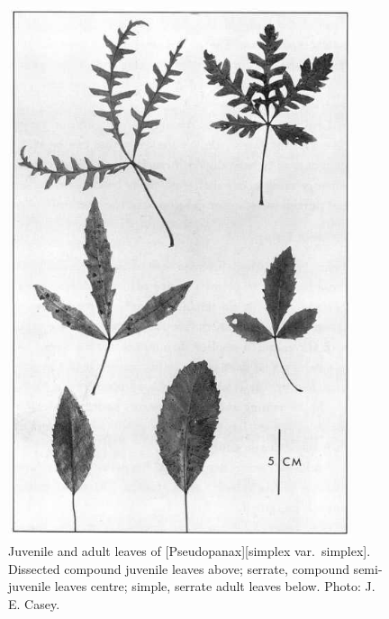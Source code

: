 \begin{figure}[!htb]
	\centering
	\begin{minipage}[t]{0.516\textwidth}
		\centering
		\includegraphics[width=0.9\textwidth]{graphics/figure18pseudopanax.jpg}
    	\caption[Juvenile and adult leaves of \emph{Pseudopanax simplex var.\ simplex}]{Juvenile and adult leaves of [Pseudopanax][simplex var.\ simplex].
        Dissected compound juvenile leaves above; serrate, compound semi-juvenile leaves centre; simple, serrate adult leaves below.
    	Photo: J. E. Casey.}%
    	\label{fig:18pseudopanax}
	\end{minipage}\hfill%
	\begin{minipage}[t]{0.464\textwidth}
    	\centering

\end{minipage}
\end{figure}
